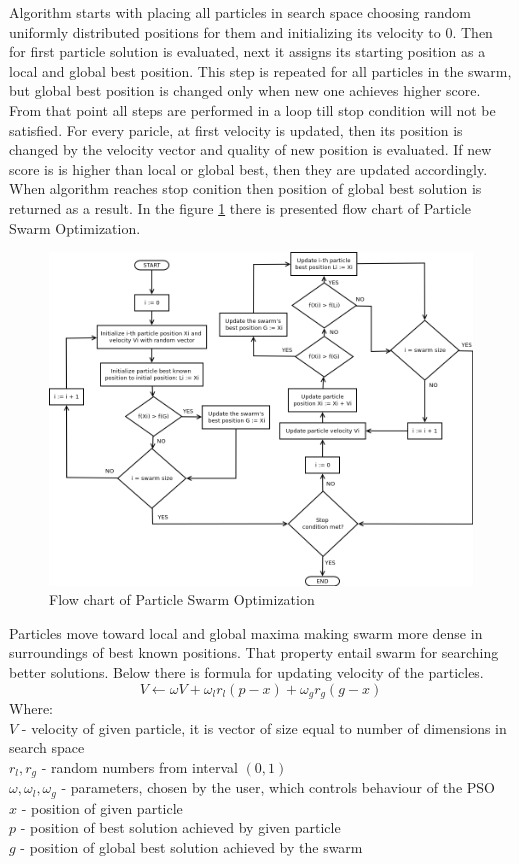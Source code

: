 Algorithm starts with placing all particles in search space choosing random uniformly distributed positions for them and initializing its velocity to 0. 
Then for first particle solution is evaluated, next it assigns its starting position as a local and global best position. 
This step is repeated for all particles in the swarm, but global best position is changed only when new one achieves higher score. 
From that point all steps are performed in a loop till stop condition will not be satisfied. For every paricle, at first 
velocity is updated, then its position is changed by the velocity vector and quality of new position is evaluated. 
If new score is is higher than local or global best, then they are updated accordingly. When algorithm reaches stop conition 
then position of global best solution is returned as a result.
In the figure \ref{pso_flowchart} there is presented flow chart of Particle Swarm Optimization.
\begin{figure}[ht]
    \centering
    \includegraphics[scale=0.4]{img/pso_flowchart.png}
    \caption{Flow chart of Particle Swarm Optimization}
    \label{pso_flowchart}
\end{figure}

Particles move toward local and global maxima making swarm more dense in surroundings of best known positions. 
That property entail swarm for searching better solutions.
Below there is formula for updating velocity of the particles.
\[ 
    V \gets \omega V + \omega _{l} r _{l} (p - x) + \omega _{g} r _{g} (g - x)
\]
Where: \\
\(V\)  - velocity of given particle, it is vector of size equal to number of dimensions in search space \\
\(r _{l}, r _{g}\) - random numbers from interval \((0,1)\) \\
\(\omega, \omega _{l}, \omega _{g}\) - parameters, chosen by the user, which controls behaviour of the PSO \\
\(x\)  - position of given particle \\
\(p\)  - position of best solution achieved by given particle \\
\(g\)  - position of global best solution achieved by the swarm \\

